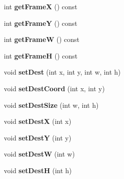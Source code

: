 \begin{DoxyCompactItemize}
\item 
int {\bfseries get\+FrameX} () const \hypertarget{classObject_ad20624ea370509e0666e9e16faec6d7b}{}\label{classObject_ad20624ea370509e0666e9e16faec6d7b}

\item 
int {\bfseries get\+FrameY} () const \hypertarget{classObject_aa4bfe9ff7f18972dc81e5e21cf5a090a}{}\label{classObject_aa4bfe9ff7f18972dc81e5e21cf5a090a}

\item 
int {\bfseries get\+FrameW} () const \hypertarget{classObject_a15fb56faeb164637a580ccea7791217d}{}\label{classObject_a15fb56faeb164637a580ccea7791217d}

\item 
int {\bfseries get\+FrameH} () const \hypertarget{classObject_a3e660243bcb095e1fdd1d0b65ea4f861}{}\label{classObject_a3e660243bcb095e1fdd1d0b65ea4f861}

\item 
void {\bfseries set\+Dest} (int x, int y, int w, int h)\hypertarget{classObject_ad84b0509560185fb9c67d7bbddab4c97}{}\label{classObject_ad84b0509560185fb9c67d7bbddab4c97}

\item 
void {\bfseries set\+Dest\+Coord} (int x, int y)\hypertarget{classObject_a2d8ce90ca6298a66a3a7f59d2d6b65c9}{}\label{classObject_a2d8ce90ca6298a66a3a7f59d2d6b65c9}

\item 
void {\bfseries set\+Dest\+Size} (int w, int h)\hypertarget{classObject_a1f84fcc4360d4bc47583ec27833f1364}{}\label{classObject_a1f84fcc4360d4bc47583ec27833f1364}

\item 
void {\bfseries set\+DestX} (int x)\hypertarget{classObject_a2757f4694225b4d7aba36613ec775a24}{}\label{classObject_a2757f4694225b4d7aba36613ec775a24}

\item 
void {\bfseries set\+DestY} (int y)\hypertarget{classObject_aa93897917882b2676c12508367c80868}{}\label{classObject_aa93897917882b2676c12508367c80868}

\item 
void {\bfseries set\+DestW} (int w)\hypertarget{classObject_a1ec31ddc68cf6bf36a32c310f888b7de}{}\label{classObject_a1ec31ddc68cf6bf36a32c310f888b7de}

\item 
void {\bfseries set\+DestH} (int h)\hypertarget{classObject_a80a3703cd45991b6cf7ee84015e66666}{}\label{classObject_a80a3703cd45991b6cf7ee84015e66666}


\end{DoxyCompactItemize}
